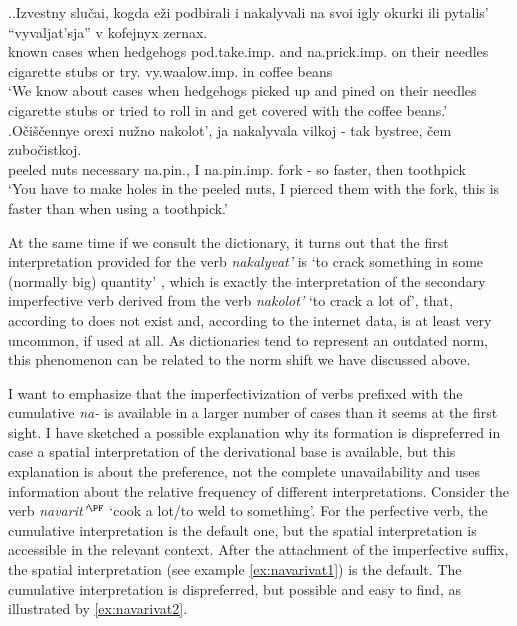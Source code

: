 \ex.\label{ex:nakalyvat}\ag.Izvestny slu\v{c}ai, kogda e\v{z}i podbirali i nakalyvali na svoi igly okurki ili pytalis' ``vyvaljat'sja'' v kofejnyx zernax.\\
known cases when hedgehogs pod.take.imp. and na.prick.imp. on their needles {cigarette stubs} or try. vy.waalow.imp. in coffee beans\\
\trans `We know about cases when hedgehogs picked up and pined on their needles cigarette stubs or tried to roll in and get covered with the coffee beans.'
\bg.O\v{c}i\v{s}\v{c}ennye orexi nu\v{z}no nakolot', ja nakalyvala vilkoj - tak bystree, \v{c}em zubo\v{c}istkoj.\\
peeled nuts necessary na.pin., I na.pin.imp. fork - so faster, then toothpick\\
\trans `You have to make holes in the peeled nuts, I pierced them with the fork, this is faster than when using a toothpick.'\\

At the same time if we consult the dictionary, it turns out that the first interpretation provided for the verb \textit{nakalyvat'} is `to crack something in some (normally big) quantity' \citep{Efremova:00}, which is exactly the interpretation of the secondary imperfective verb derived from the verb \textit{nakolot'} `to crack a lot of', that, according to \citet{Svenonius:04b} does not exist and, according to the internet data, is at least very uncommon, if used at all. As dictionaries tend to represent an outdated norm, this phenomenon can be related to the norm shift we have discussed above.

I want to emphasize that the imperfectivization of verbs prefixed with the cumulative \textit{na-} is available in a larger number of cases than it seems at the first sight. I have sketched a possible explanation why its formation is dispreferred in case a spatial interpretation of the derivational base is available, but this explanation is about the preference, not the complete unavailability and uses information about the relative frequency of different interpretations. Consider the verb \textit{navarit'}$^{\PF}$ `cook a lot/to weld to something'. For the perfective verb, the cumulative interpretation is the default one, but the spatial interpretation is accessible in the relevant context. After the attachment of the imperfective suffix, the spatial interpretation (see example \ref{ex:navarivat1}) is the default. The cumulative interpretation is dispreferred, but possible and easy to find, as illustrated by \ref{ex:navarivat2}.


